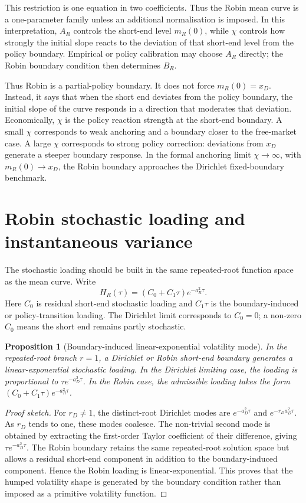 \documentclass[11pt]{article}
\newtheorem{proposition}{Proposition}
\numberwithin{equation}{section}
\begin{document}
This restriction is one equation in two coefficients. Thus the Robin mean curve is a one-parameter family unless an additional normalisation is imposed. In this interpretation, $A_R$ controls the short-end level $m_R(0)$, while $\chi$ controls how strongly the initial slope reacts to the deviation of that short-end level from the policy boundary. Empirical or policy calibration may choose $A_R$ directly; the Robin boundary condition then determines $B_R$.

Thus Robin is a partial-policy boundary. It does not force $m_R(0)=x_D$. Instead, it says that when the short end deviates from the policy boundary, the initial slope of the curve responds in a direction that moderates that deviation. Economically, $\chi$ is the policy reaction strength at the short-end boundary. A small $\chi$ corresponds to weak anchoring and a boundary closer to the free-market case. A large $\chi$ corresponds to strong policy correction: deviations from $x_D$ generate a steeper boundary response. In the formal anchoring limit $\chi\to\infty$, with $m_R(0)\to x_D$, the Robin boundary approaches the Dirichlet fixed-boundary benchmark.

\section{Robin stochastic loading and instantaneous variance}

The stochastic loading should be built in the same repeated-root function space as the mean curve. Write
\begin{equation}
\label{eq:robin-loading}
H_R(\tau)=(C_0+C_1\tau)e^{-a_R^2\tau}.
\end{equation}
Here $C_0$ is residual short-end stochastic loading and $C_1\tau$ is the boundary-induced or policy-transition loading. The Dirichlet limit corresponds to $C_0=0$; a non-zero $C_0$ means the short end remains partly stochastic.

\begin{proposition}[Boundary-induced linear-exponential volatility mode]
In the repeated-root branch $r=1$, a Dirichlet or Robin short-end boundary generates a linear-exponential stochastic loading. In the Dirichlet limiting case, the loading is proportional to $\tau e^{-a_D^2\tau}$. In the Robin case, the admissible loading takes the form $(C_0+C_1\tau)e^{-a_R^2\tau}$.
\end{proposition}

\begin{proof}[Proof sketch]
For $r_D\neq1$, the distinct-root Dirichlet modes are $e^{-a_D^2\tau}$ and $e^{-r_Da_D^2\tau}$. As $r_D$ tends to one, these modes coalesce. The non-trivial second mode is obtained by extracting the first-order Taylor coefficient of their difference, giving $\tau e^{-a_D^2\tau}$. The Robin boundary retains the same repeated-root solution space but allows a residual short-end component in addition to the boundary-induced component. Hence the Robin loading is linear-exponential. This proves that the humped volatility shape is generated by the boundary condition rather than imposed as a primitive volatility function.
\end{proof}
\end{document}
